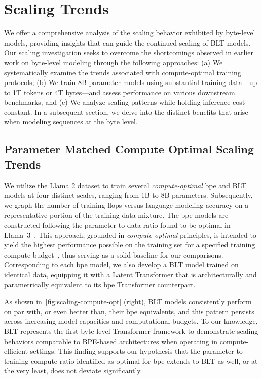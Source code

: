 \section{Scaling Trends}
\label{section:scaling}

We offer a comprehensive analysis of the scaling behavior exhibited by byte-level models, providing insights that can guide the continued scaling of {\textsc BLT} models. Our scaling investigation seeks to overcome the shortcomings observed in earlier work on byte-level modeling through the following approaches: (a) We systematically examine the trends associated with compute-optimal training protocols; (b) We train 8B-parameter models using substantial training data—up to 1T tokens or 4T bytes—and assess performance on various downstream benchmarks; and (c) We analyze scaling patterns while holding inference cost constant. In a subsequent section, we delve into the distinct benefits that arise when modeling sequences at the byte level.

\subsection{Parameter Matched Compute Optimal Scaling Trends}
\label{section:parameter-matched-scaling}
We utilize the Llama 2 dataset to train several \textit{compute-optimal} bpe and {\textsc BLT} models at four distinct scales, ranging from 1B to 8B parameters. Subsequently, we graph the number of training flops versus language modeling accuracy on a representative portion of the training data mixture. The bpe models are constructed following the parameter-to-data ratio found to be optimal in Llama~3~\citep{dubey2024llama}. This approach, grounded in \textit{compute-optimal} principles, is intended to yield the highest performance possible on the training set for a specified training compute budget~\citep{hoffmann2022training}, thus serving as a solid baseline for our comparisons. Corresponding to each bpe model, we also develop a {\textsc BLT} model trained on identical data, equipping it with a Latent Transformer that is architecturally and parametrically equivalent to its bpe Transformer counterpart.

As shown in~\autoref{fig:scaling-compute-opt} (right), {\textsc BLT} models consistently perform on par with, or even better than, their bpe equivalents, and this pattern persists across increasing model capacities and computational budgets. To our knowledge, {\textsc BLT} represents the first byte-level Transformer framework to demonstrate scaling behaviors comparable to BPE-based architectures when operating in compute-efficient settings. This finding supports our hypothesis that the parameter-to-training-compute ratio identified as optimal for bpe extends to {\textsc BLT} as well, or at the very least, does not deviate significantly.

